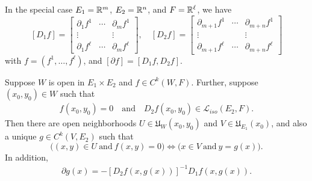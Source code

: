 \begin{remark}
In the special case $E_1=\mathbb{R}^m$, $E_2=\mathbb{R}^n$, and $F=\mathbb{R}^{\ell}$, we have
\[[D_1f]=\begin{bmatrix}
\partial_1f^1 &\cdots& \partial_mf^1\\
\vdots &   &  \vdots\\
\partial_1f^{\ell} & \cdots &\partial_mf^{\ell}
\end{bmatrix},\quad
[D_2f]=\begin{bmatrix}
\partial_{m+1}f^1 &\cdots& \partial_{m+n}f^1\\
\vdots &   &  \vdots\\
\partial_{m+1}f^\ell & \cdots &\partial_{m+n}f^{\ell}
\end{bmatrix}\]
with $f=(f^1,\dots,f^{\ell})$, and $[\partial f]=[D_1f,D_2f]$.
\end{remark}
\begin{theorem}\label{implicit function}
Suppose $W$ is open in $E_1\times E_2$ and $f\in C^k(W,F)$.
Further, suppose $(x_0,y_0)\in W$ such that
\begin{align}\label{implicit function-1}
f(x_0,y_0)=0\quad\text{and}\quad D_2f(x_0,y_0)\in\mathcal{L}_{iso}(E_2,F).
\end{align}
Then there are open neighborhoods $U\in \mathfrak{U}_W(x_0,y_0)$ and $V\in\mathfrak{U}_{E_1}(x_0)$, and also a unique $g\in C^k(V,E_2)$ such that
\[\big((x,y)\in U\ \text{and}\ f(x,y)=0\big)\iff \big(x\in V\ \text{and}\ y=g(x)\big).\]
In addition,
\begin{align}\label{implicit function-2}
\partial g(x)=-[D_2f(x,g(x))]^{-1}D_1f(x,g(x)).
\end{align}
\end{theorem}

